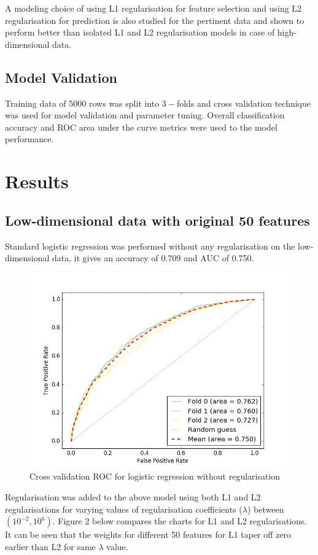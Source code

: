 \documentclass[paper=a4,fontsize=12pt]{article}
\begin{document}
A modeling choice of using L1 regularisation for feature selection and using L2 regularisation for prediction is also studied for the pertinent data and shown to perform better than isolated L1 and L2 regularisation models in case of high-dimensional data.


\subsection{Model Validation}
Training data of 5000 rows was split into $3-$folds and cross validation technique was used for model validation and parameter tuning. Overall classification accuracy and ROC area under the curve metrics were used to the model performance. 

\section{Results}
\subsection{Low-dimensional data with original 50 features}
Standard logistic regression was performed without any regularisation on the low-dimensional data, it gives an accuracy of 0.709 and AUC of 0.750.
\begin{figure}[H]
\centering
\includegraphics[width=0.5\linewidth]{00_noregularisation_of}
\caption{Cross validation ROC for logistic regression without regularisation}
\end{figure}

Regularisation was added to the above model using both L1 and L2 regularisations for varying values of regularisation coefficients ($\lambda$) between $(10^{-2},10^6)$. Figure 2 below compares the charts for L1 and L2 regularisations. It can be seen that the weights for different 50 features for L1 taper off zero earlier than L2 for same $\lambda$ value.
\end{document}
